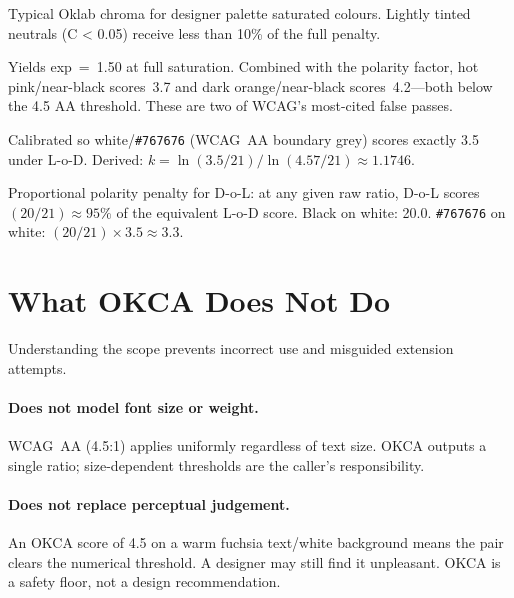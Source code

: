 \documentclass[11pt,a4paper]{article}
\begin{document}
\begin{description}[style=nextline,leftmargin=2em]
  \item[C\_THRESH = 0.15]
    Typical Oklab chroma for designer palette saturated colours.
    Lightly tinted neutrals (C < 0.05) receive less than 10\% of
    the full penalty.

  \item[CHROMA\_K = 0.50]
    Yields exp~=~1.50 at full saturation.  Combined with the polarity
    factor, hot pink/near-black scores~3.7 and dark orange/near-black
    scores~4.2---both below the 4.5 AA threshold.  These are two of
    WCAG's most-cited false passes.

  \item[POL\_K = 1.175]
    Calibrated so white/\texttt{\#767676} (WCAG~AA boundary grey)
    scores exactly 3.5 under L-o-D.  Derived:
    $k = \ln(3.5/21) / \ln(4.57/21) \approx 1.1746$.

  \item[DOL\_CAP = 20]
    Proportional polarity penalty for D-o-L: at any given raw ratio,
    D-o-L scores $(20/21) \approx 95\%$ of the equivalent L-o-D score.
    Black on white: 20.0.  \texttt{\#767676} on white:
    $(20/21) \times 3.5 \approx 3.3$.
\end{description}

\section{What OKCA Does Not Do}

Understanding the scope prevents incorrect use and misguided extension
attempts.

\paragraph{Does not model font size or weight.}
WCAG~AA (4.5:1) applies uniformly regardless of text size.  OKCA outputs
a single ratio; size-dependent thresholds are the caller's
responsibility.

\paragraph{Does not replace perceptual judgement.}
An OKCA score of 4.5 on a warm fuchsia text/white background means the
pair clears the numerical threshold.  A designer may still find it
unpleasant.  OKCA is a safety floor, not a design recommendation.
\end{document}
